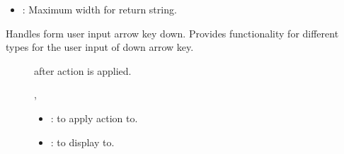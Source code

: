 \documentclass[letterpaper,10pt,english]{sphinxmanual}
\begin{document}
\begin{fulllineitems}
\begin{fulllineitems}
\begin{description}
\begin{itemize}
\item {} 
: Maximum width for return string. 

\end{itemize}

\end{description}


\end{fulllineitems}


\begin{fulllineitems}
\label{\detokenize{index:_CPPv2N7ostendo9DownArrowE3Var6Window}}%
\pysigstartmultiline
{}\label{\detokenize{index:Pessumnamespaceostendo_1a0eff2d6c60790fa96f06511e3a01f3a4}}%
\pysigstopmultiline
Handles form user input arrow key down. Provides functionality for different {\hyperref[\detokenize{index:Pessumstructostendo_1_1Var}]{}} types for the user input of down arrow key. \begin{description}
\item[{}] \leavevmode
{\hyperref[\detokenize{index:Pessumstructostendo_1_1Var}]{}} after action is applied. 

\item[{}] \leavevmode
{\hyperref[\detokenize{index:Pessumstructostendo_1_1Var}]{}}, {\hyperref[\detokenize{index:Pessumclassostendo_1_1Window}]{}} 

\item[{}] \leavevmode\begin{itemize}
\item {} 
: {\hyperref[\detokenize{index:Pessumstructostendo_1_1Var}]{}} to apply action to. 

\item {} 
: {\hyperref[\detokenize{index:Pessumclassostendo_1_1Window}]{}} to display to. 


\end{itemize}
\end{description}
\end{fulllineitems}
\end{fulllineitems}
\end{document}
